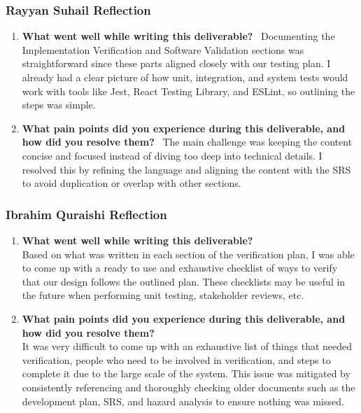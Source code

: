 \documentclass[12pt, titlepage]{article}
\begin{document}
\subsubsection*{Rayyan Suhail Reflection}
\begin{enumerate}
\item \textbf{What went well while writing this deliverable?} \
Documenting the Implementation Verification and Software Validation sections was straightforward since these parts aligned closely with our testing plan. I already had a clear picture of how unit, integration, and system tests would work with tools like Jest, React Testing Library, and ESLint, so outlining the steps was simple.

\item \textbf{What pain points did you experience during this deliverable, and how did you resolve them?} \
The main challenge was keeping the content concise and focused instead of diving too deep into technical details. I resolved this by refining the language and aligning the content with the SRS to avoid duplication or overlap with other sections.
\end{enumerate}

\subsubsection*{Ibrahim Quraishi Reflection}
\begin{enumerate}
  \item \textbf{What went well while writing this deliverable?} \\
  Based on what was written in each section of the verification plan, I was able to come up with a ready to use and exhaustive checklist of ways to verify that our design follows the outlined plan. These checklists may be useful in the future when performing unit testing, stakeholder reviews, etc.
  \item \textbf{What pain points did you experience during this deliverable, and how did you resolve them?} \\
  It was very difficult to come up with an exhaustive list of things that needed verification, people who need to be involved in verification, and steps to complete it due to the large scale of the system. This issue was mitigated by consistently referencing and thoroughly checking older documents such as the development plan, SRS, and hazard analysis to ensure nothing was missed.
\end{enumerate}
\end{document}
